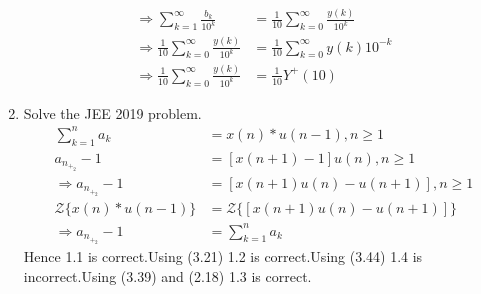 \documentclass[journal,12pt,twocolumn]{IEEEtran}
\renewcommand\thesection{\arabic{section}}
\begin{document}
\begin{enumerate}[label=\thesection.\arabic*,ref=\thesection.\theenumi]
\begin{align}
	\Rightarrow \sum_{k=1}^{\infty}\frac{b_k}{10^{k}}&=\frac{1}{10}\sum_{k=0}^{\infty}\frac{y(k)}{10^{k}}\\
	\Rightarrow \frac{1}{10}\sum_{k=0}^{\infty}\frac{y(k)}{10^{k}}&=\frac{1}{10}\sum_{k=0}^{\infty}y(k)10^{-k}\\
	\Rightarrow \frac{1}{10}\sum_{k=0}^{\infty}\frac{y(k)}{10^{k}}&=\frac{1}{10}Y^{+}(10)
\end{align}
\item Solve the JEE 2019 problem.\\
\solution
\begin{align}
	\sum_{k=1}^{n}a_k&=x(n)*u(n-1),n \ge 1\\
	a_n_+_2-1&=[x(n+1)-1]u(n),n \ge 1\\
	\Rightarrow a_n_+_2-1&=[x(n+1)u(n)-u(n+1)],n \ge 1\\
	{\mathcal {Z}}\{x(n)*u(n-1)\}&={\mathcal {Z}}\{[x(n+1)u(n)-u(n+1)]\}\\
	\Rightarrow a_n_+_2-1&=\sum_{k=1}^{n}a_k
\end{align}
Hence 1.1 is correct.Using (3.21) 1.2 is correct.Using (3.44) 1.4 is incorrect.Using (3.39) and (2.18) 1.3 is correct.
\end{enumerate}
\end{document}
